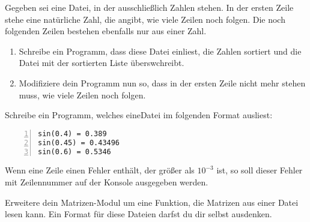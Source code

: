 \documentclass{uebungszettel}
\begin{document}
\newcommand{\ah}[2]{\ \\* \emph{(#1, #2)}\\}
\newcommand{\power}{\mathrm{power}}

\begin{aufg}
Gegeben sei eine Datei, in der ausschließlich Zahlen stehen. In der ersten Zeile stehe eine natürliche Zahl, die angibt, wie viele Zeilen noch folgen. Die noch folgenden Zeilen bestehen ebenfalls nur aus einer Zahl. 
\begin{enumerate}
\item Schreibe ein Programm, dass diese Datei einliest, die Zahlen sortiert und die Datei mit der sortierten Liste überswchreibt.
\item Modifiziere dein Programm nun so, dass in der ersten Zeile nicht mehr stehen muss, wie viele Zeilen noch folgen.
\end{enumerate}
\end{aufg}

\begin{aufg}
Schreibe ein Programm, welches eineDatei im folgenden Format ausliest:
\medskip \begin{codelisting}
\begin{lstlisting}[numbers=left,numberstyle=\tiny,frame=tlrb,mathescape=true]
sin(0.4) = 0.389
sin(0.45) = 0.43496
sin(0.6) = 0.5346
\end{lstlisting}
\end{codelisting}
Wenn eine Zeile einen Fehler enthält, der größer als $10^{-3}$ ist, so soll dieser Fehler mit Zeilennummer auf der Konsole ausgegeben werden.
\end{aufg}

\begin{aufg} Erweitere dein Matrizen-Modul um eine Funktion, die Matrizen aus einer Datei lesen kann. Ein Format für diese Dateien darfst du dir selbst ausdenken.
\end{aufg}
\end{document}
